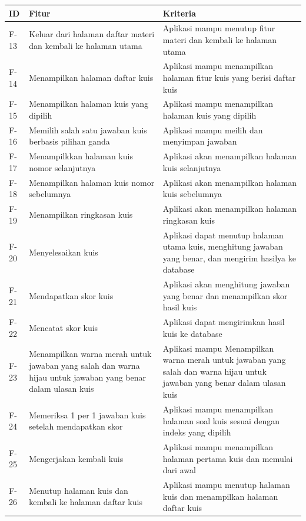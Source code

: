 \newpage
\begin{table}[H]
	\begin{tabular}{|m{1cm}|p{}|p{}|}
		\hline
		\centering\textbf{ID} & \centering\textbf{Fitur} & \multicolumn{1}{m{0.45\textwidth}|}{\centering \textbf{Kriteria}} \\
		\hline
		F-13&Keluar dari halaman daftar materi dan kembali ke halaman utama& Aplikasi mampu menutup fitur materi dan kembali ke halaman utama \\
		\hline
		F-14 &Menampilkan halaman daftar kuis&  Aplikasi mampu menampilkan halaman fitur kuis yang berisi daftar kuis\\
		\hline
		F-15&Menampilkan halaman kuis yang dipilih&  Aplikasi mampu menampilkan halaman kuis yang dipilih \\
		\hline
		F-16&Memilih salah satu jawaban kuis berbasis pilihan ganda& Aplikasi mampu meilih dan menyimpan jawaban \\
		\hline
		F-17&Menampilkkan halaman kuis nomor selanjutnya& Aplikasi akan menampilkan halaman kuis selanjutnya\\
		\hline
		F-18&Menampilkan halaman kuis nomor sebelumnya& Aplikasi akan menampilkan halaman kuis sebelumnya \\
		\hline
		F-19&Menampilkan ringkasan kuis& Aplikasi akan menampilkan halaman ringkasan kuis  \\
		\hline
		F-20&Menyelesaikan kuis& Aplikasi dapat menutup halaman utama kuis, menghitung jawaban yang benar, dan mengirim hasilya ke database \\
		\hline
		F-21&Mendapatkan skor kuis& Aplikasi akan  menghitung jawaban yang benar dan menampilkan skor hasil kuis \\
		\hline
		F-22&Mencatat skor kuis& Aplikasi dapat mengirimkan hasil kuis ke database\\
		\hline
		F-23&Menampilkan warna merah untuk jawaban yang salah dan warna hijau untuk jawaban yang benar dalam ulasan kuis& Aplikasi mampu Menampilkan warna merah untuk jawaban yang salah dan warna hijau untuk jawaban yang benar dalam ulasan kuis  \\
		\hline
		F-24&Memeriksa 1 per 1 jawaban kuis setelah mendapatkan skor& Aplikasi mampu menampilkan halaman soal kuis sesuai dengan indeks yang dipilih \\
		\hline
		F-25&Mengerjakan kembali kuis& Aplikasi mampu menampilkan halaman pertama kuis dan memulai dari awal\\
		\hline
		F-26&Menutup halaman kuis dan kembali ke halaman daftar kuis& Aplikasi mampu menutup halaman kuis dan menampilkan halaman daftar kuis \\
		\hline
	\end{tabular}
\end{table}
